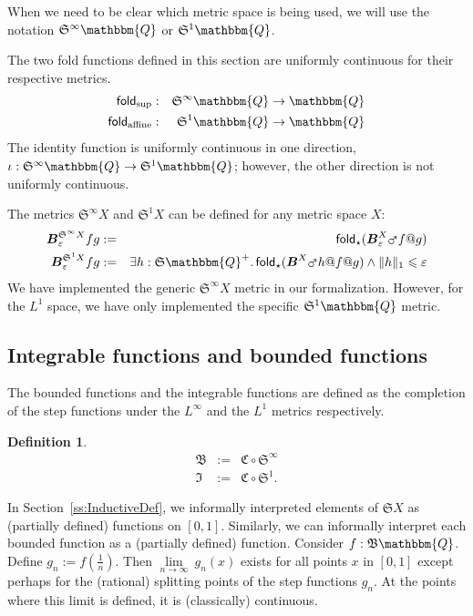\documentclass{elsarticle}
\makeatletter
\newcommand{\assign}{:=}
\newcommand{\op}[1]{#1}
\newcommand{\tmmathbf}[1]{\ensuremath{\boldsymbol{#1}}}
\newcommand{\tmop}[1]{\ensuremath{\operatorname{#1}}}
\newcommand{\upl}{+}
\newtheorem{definition}{Definition}
\newcommand{\arr}{\ensuremath{\rightarrow}}
\newcommand{\C}{\ensuremath{\mathfrak{C}}}
\newcommand{\uc}{uniformly continuous}
\newcommand{\ballsym}{\ensuremath{\tmmathbf{B}}}
\newcommand{\ball}[4]{\ensuremath{\ballsym^{#1}_{#2}  #3  #4}}
\newcommand{\Prop}{\ensuremath{\op{\star}}}
\newcommand{\app}{@}
\newcommand{\Map}{\ensuremath{\mars}}
\newcommand{\SF}{\ensuremath{\mathfrak{S}}}
\newcommand{\BF}{\ensuremath{\mathfrak{B}}}
\newcommand{\IF}{\ensuremath{\mathfrak{I}}}
\makeatother
\begin{document}
When we need to be clear which metric space
is being used, we will use the notation $\SF^{\infty} \mathbbm{Q}$ or $\SF^1
\mathbbm{Q}$.

The two fold functions defined in this section are uniformly continuous for
their respective metrics.
\begin{eqnarray*}
  \tmop{\mathsf{fold}}_{\sup} & : & \SF^{\infty} \mathbbm{Q} \arr
  \mathbbm{Q}\\
  \tmop{\mathsf{fold}}_{\tmop{affine}} & : & \SF^1 \mathbbm{Q} \arr
  \mathbbm{Q}
\end{eqnarray*}
The identity function is {\uc} in one direction, $\iota :
\SF^{\infty} \mathbbm{Q} \arr \SF^1 \mathbbm{Q}$; however, the other direction
is not {\uc}.

The metrics $\mathfrak{S}^{\infty} X$ and $\SF^1 X$ can be defined for any
metric space $X$:
\begin{eqnarray}
  \ball{\SF^{\infty} X}{\varepsilon}{f}{g} & \assign &
  \tmop{\mathsf{fold}}_{\Prop} ( \ballsym^X_{\varepsilon} \Map f \app g)
  \nonumber\\
  \ball{\SF^1 X}{\varepsilon}{f}{g} & \assign & \exists h : \SF
  \mathbbm{Q}^{\upl} . \tmop{\mathsf{fold}}_{\Prop} ( \ballsym^X \Map h \app f
  \app g) \wedge \|h\|_1 \leqslant \varepsilon \nonumber
\end{eqnarray}
We have implemented the generic $\mathfrak{S}^{\infty} X$ metric in our
formalization. However, for the $L^1$ space, we have only implemented the
specific $\SF^1 \mathbbm{Q}$ metric.

\subsection{Integrable functions and bounded functions}\label{ss:IFBF}The
bounded functions and the integrable functions are defined as the completion of the step functions
under the $L^{\infty}$ and the $L^1$ metrics respectively.

\begin{definition}
  \begin{eqnarray*}
    \BF & \assign & \C \circ \SF^{\infty}\\
    \IF & \assign & \C \circ \SF^1 .
  \end{eqnarray*}
\end{definition}

In Section~\ref{ss:InductiveDef}, we informally interpreted elements of $\SF
X$ as (partially defined) functions on $[0, 1]$. Similarly, we can informally
interpret each bounded function as a (partially defined) function. Consider $f
: \BF \mathbbm{Q}$. Define $g_n \assign f \left( \frac{1}{n} \right)$. Then
$\underset{n \rightarrow \infty}{\lim} ~ g_n (x)$ exists for all points $x$ in
$[0,1]$ except perhaps for the (rational) splitting points of the step
functions $g_n$. At the points where this limit is defined, it is
(classically) continuous.
\end{document}
